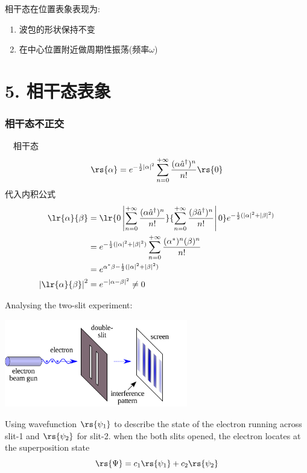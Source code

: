 \begin{frame} 
\frametitle{}
    \begin{center}
    \end{center} 
相干态在位置表象表现为: 
\begin{enumerate}
  \item 波包的形状保持不变
  \item 在中心位置附近做周期性振荡(频率$\omega$)
\end{enumerate}  
\end{frame}

\section{5. 相干态表象}

\begin{frame}
    \frametitle{相干态不正交}
        \例[12.试证明相干态不具正交性]{}
        \证 ~ 相干态
        \[\rs{\alpha}=e^{-\frac{1}{2}\left|\alpha\right|^2}  \sum_{n=0} ^{+\infty}  \frac{(\alpha\hat{a}^\dagger)^n}{n!}\rs{0} \] 
    代入内积公式
    \[ \begin{aligned}
     \lr{\alpha}{\beta} &= \lr{0\left|\sum_{n=0} ^{+\infty}\frac{(\alpha\hat{a}^\dagger)^n}{n!}}{\sum_{n=0} ^{+\infty}\frac{(\beta\hat{a}^\dagger)^n}{n!}\right|0} e^{-\frac{1}{2}(\left|\alpha\right|^2 +\left|\beta\right|^2)}\\ 
     &= e^{-\frac{1}{2}(\left|\alpha\right|^2 +\left|\beta\right|^2)} \sum_{n=0} ^{+\infty}\frac{(\alpha^*)^n (\beta)^n}{n!} \\ 
     &= e^{\alpha^* \beta -\frac{1}{2}(\left|\alpha\right|^2 +\left|\beta\right|^2)} \\ 
     \left|\lr{\alpha}{\beta} \right|^2 &= e^{-  \left| \alpha - \beta\right|^2} \not = 0 
    \end{aligned}\]
\end{frame}

\begin{frame}
    Analysing the two-slit experiment:
      \begin{center}
           \includegraphics[width=0.6\textwidth]{figs/Etwoslitexp.png}
      \end{center}
    \begin{itemize}
        \Item Using wavefunction $\rs{\psi_1}$ to describe the state of the electron running across slit-1 and $\rs{\psi_2}$ for slit-2. when the both slits opened, the electron locates at the superposition state
            \[ \rs{\Psi}=c_1 \rs{\psi_1}+ c_2\rs{\psi_2} \]
    \end{itemize}
\end{frame}


